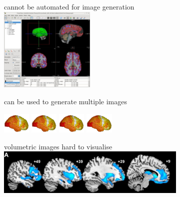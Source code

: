 \documentclass[10pt,xcolor=table,aspectratio=169]{beamer}
\begin{document}
\begin{frame}
\begin{figure}
\begin{subfigure}[t]{0.3\textwidth}
\end{subfigure}
\begin{subfigure}[t]{0.3\textwidth}
\centering
 \begin{minipage}[t][3.5cm][t]{\textwidth}
 \centering
\myno cannot be automated for image generation\\
\includegraphics[width=0.5\textwidth]{images/freeviewInterface.jpg}
 \end{minipage}


\myyes can be used to generate multiple images

\includegraphics[height=1cm,trim=0 0 900 0]{images/brainTransparent} 
\includegraphics[height=1cm,trim=0 0 900 0]{images/brainTransparent} 
\includegraphics[height=1cm,trim=0 0 900 0]{images/brainTransparent} 
\includegraphics[height=1cm]{images/brainTransparent} 



\end{subfigure}
\begin{subfigure}[t]{0.3\textwidth}
\centering
 \begin{minipage}[t][3.5cm][t]{\textwidth}
 \centering
\myno volumetric images hard to visualise\\
\vspace{1.5em}
\includegraphics[width=\textwidth]{images/seeleyImages} 
\vspace{1.0em}
 \end{minipage}



\end{subfigure}
\end{figure}
\end{frame}
\end{document}
